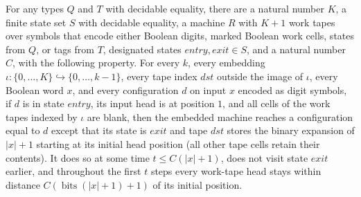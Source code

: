 \begin{theorem}
\label{Turing.rt_exists_boundFieldTM}
\leanok
{}
For any types $Q$ and $T$ with decidable equality, there are a natural number $K$, a
finite state set $S$ with decidable equality, a machine $R$ with $K+1$ work tapes over
symbols that encode either Boolean digits, marked Boolean work cells, states from $Q$,
or tags from $T$, designated states $entry,exit\in S$, and a natural number $C$, with
the following property. For every $k$, every embedding
$\iota:\{0,\ldots,K\}\hookrightarrow\{0,\ldots,k-1\}$, every tape index $dst$ outside
the image of $\iota$, every Boolean word $x$, and every configuration $d$ on input $x$
encoded as digit symbols, if $d$ is in state $entry$, its input head is at position $1$,
and all cells of the work tapes indexed by $\iota$ are blank, then the embedded machine
reaches a configuration equal to $d$ except that its state is $exit$ and tape $dst$
stores the binary expansion of $|x|+1$ starting at its initial head position (all other
tape cells retain their contents). It does so at some time $t\le C(|x|+1)$, does not
visit state $exit$ earlier, and throughout the first $t$ steps every work-tape head
stays within distance $C(\operatorname{bits}(|x|+1)+1)$ of its initial position.
\end{theorem}

